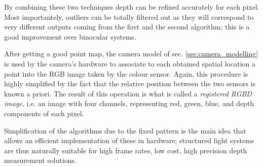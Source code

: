 By combining these two techniques depth can be refined accurately for each
pixel. Most importantely, outliers can be totally filtered out as they will
correspond to very different outputs coming from the first and the second
algorithm; this is a good improvement over binocular systems.

After getting a good point map, the camera model of sec.
\ref{sec:camera_modelling} is used by the camera's hardware to associate to each
obtained spatial location a point into the RGB image taken by the colour sensor.
Again, this procedure is highly simplified by the fact that the relative
position between the two sensors is known a priori. The result of this operation
is what is called a \emph{registered RGBD image}, i.e. an image with four
channels, representing red, green, blue, and depth components of each pixel.

Simplification of the algorithms due to the fixed pattern is the main idea that
allows an efficient implementation of these in hardware; structured light systems are thus
naturally suitable for high frame rates, low cost, high precision depth
measurement solutions.
